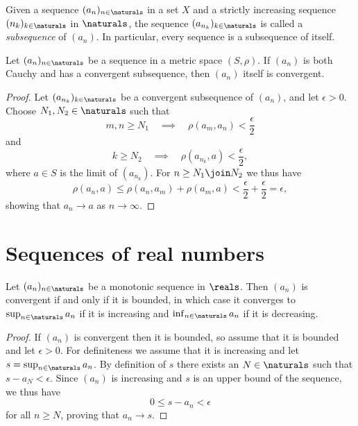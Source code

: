\documentclass[article, a4paper, 11pt, oneside]{memoir}
\numberwithin{equation}{chapter}
\begin{document}
Given a sequence $(a_n)_{n\in\naturals}$ in a set $X$ and a strictly increasing sequence $(n_k)_{k\in\naturals}$ in $\naturals$, the sequence $(a_{n_k})_{k\in\naturals}$ is called a \emph{subsequence} of $(a_n)$. In particular, every sequence is a subsequence of itself.

\begin{lemma}
    Let $(a_n)_{n\in\naturals}$ be a sequence in a metric space $(S,\rho)$. If $(a_n)$ is both Cauchy and has a convergent subsequence, then $(a_n)$ itself is convergent.
\end{lemma}

\begin{proof}
    Let $(a_{n_k})_{k\in\naturals}$ be a convergent subsequence of $(a_n)$, and let $\epsilon > 0$. Choose $N_1, N_2 \in \naturals$ such that
    \begin{equation*}
        m,n \geq N_1
        \quad \implies \quad
        \rho(a_m, a_n) < \frac{\epsilon}{2}
    \end{equation*}
    and
    \begin{equation*}
        k \geq N_2
        \quad \implies \quad
        \rho(a_{n_k}, a) < \frac{\epsilon}{2},
    \end{equation*}
    where $a \in S$ is the limit of $(a_{n_k})$. For $n \geq N_1 \join N_2$ we thus have
    \begin{equation*}
        \rho(a_n, a)
            \leq \rho(a_n, a_m) + \rho(a_m, a)
            < \frac{\epsilon}{2} + \frac{\epsilon}{2}
            = \epsilon,
    \end{equation*}
    showing that $a_n \to a$ as $n \to \infty$.
\end{proof}


\section{Sequences of real numbers}

\begin{proposition}
    Let $(a_n)_{n\in\naturals}$ be a monotonic sequence in $\reals$. Then $(a_n)$ is convergent if and only if it is bounded, in which case it converges to $\sup_{n\in\naturals} a_n$ if it is increasing and $\inf_{n\in\naturals} a_n$ if it is decreasing.
\end{proposition}

\begin{proof}
    If $(a_n)$ is convergent then it is bounded, so assume that it is bounded and let $\epsilon > 0$. For definiteness we assume that it is increasing and let $s = \sup_{n\in\naturals} a_n$. By definition of $s$ there exists an $N \in \naturals$ such that $s - a_N < \epsilon$. Since $(a_n)$ is increasing and $s$ is an upper bound of the sequence, we thus have
    \begin{equation*}
        0 \leq s - a_n < \epsilon
    \end{equation*}
    for all $n \geq N$, proving that $a_n \to s$.
\end{proof}
\end{document}
